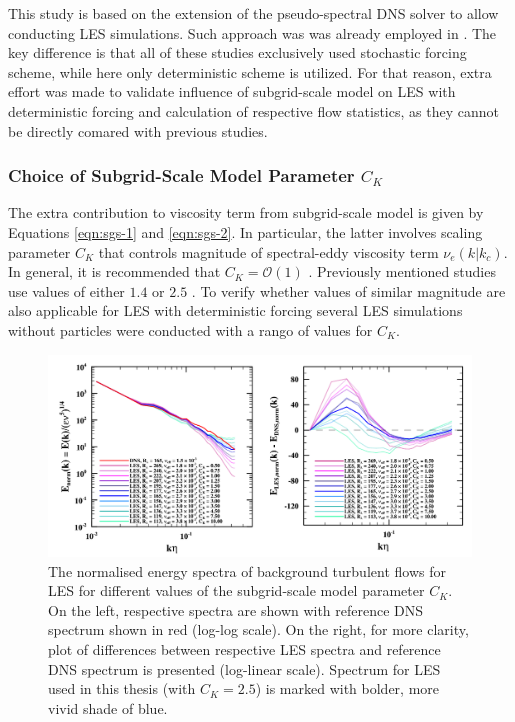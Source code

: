 \documentclass{pracamgren}
\begin{document}
This study is based on the extension of the pseudo-spectral DNS solver to allow conducting LES simulations.
Such approach was was already employed in \textcite{Yang2008,Jin2010,Rosa2017}.
The key difference is that all of these studies exclusively used stochastic forcing scheme, while here only deterministic scheme is utilized.
For that reason, extra effort was made to validate influence of subgrid-scale model on LES with deterministic forcing and calculation of respective flow statistics, as they cannot be directly comared with previous studies.

\subsubsection{Choice of Subgrid-Scale Model Parameter $C_K$}

The extra contribution to viscosity term from subgrid-scale model is given by Equations \ref{eqn:sgs-1} and \ref{eqn:sgs-2}.
In particular, the latter involves scaling parameter $C_K$ that controls magnitude of spectral-eddy viscosity term $\nu_{e}(k|k_c)$.
In general, it is recommended that $C_K = \mathcal{O}(1)$ \parencite{Chollet1981}.
Previously mentioned studies use values of either $1.4$ \parencite{Yang2008} or $2.5$ \parencite{Jin2010,Rosa2017}.
To verify whether values of similar magnitude are also applicable for LES with deterministic forcing several LES simulations without particles were conducted with a rango of values for $C_K$.

\begin{figure}[ht]
\centering
\includegraphics[width=13.5cm]{figures/B-01_sgsspec.pdf}
\caption{
The normalised energy spectra of background turbulent flows for LES for different values of the subgrid-scale model parameter $C_K$. 
On the left, respective spectra are shown with reference DNS spectrum shown in red (log-log scale).
On the right, for more clarity, plot of differences between respective LES spectra and reference DNS spectrum is presented (log-linear scale).
Spectrum for LES used in this thesis (with $C_K=2.5$) is marked with bolder, more vivid shade of blue.
}
\label{fig:sgsspec}
\end{figure}
\end{document}
